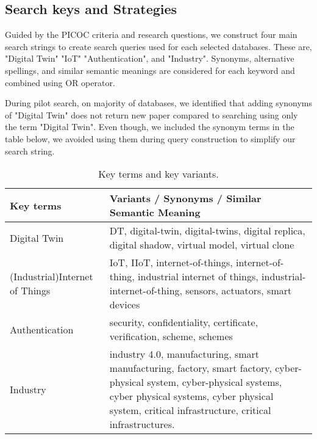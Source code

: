 \subsection{Search keys and Strategies}
Guided by the PICOC criteria and  research questions, we construct four main search strings to create search queries used for each selected databases. These are, "Digital Twin" "IoT" "Authentication", and "Industry". Synonyms, alternative spellings, and similar semantic meanings are considered for each keyword and combined using OR operator. 

During pilot search, on majority of databases, we identified that adding synonyms of "Digital Twin" does not return new paper compared to searching using only the term "Digital Twin". Even though, we included the synonym terms in the table below, we avoided using them during query construction to simplify our search string. 

\begin{table}[h]
\caption{ Key terms and key variants.}
\begin{NiceTabular}{p{3.2cm}p{11cm}}
\toprule
    \textbf{Key terms} & \textbf{Variants / Synonyms / Similar Semantic Meaning} \\
    \midrule
    Digital Twin & DT, digital-twin, digital-twins, digital replica, digital shadow, virtual model, virtual clone \\ \hline
    (Industrial)Internet of Things & IoT, IIoT, internet-of-things, internet-of-thing, industrial internet of things, industrial-internet-of-thing, sensors, actuators, smart devices  \\ \hline
    Authentication & security, confidentiality, certificate, verification, scheme, schemes\\ \hline
    Industry & industry 4.0, manufacturing, smart manufacturing, factory, smart factory, cyber-physical system, cyber-physical systems, cyber physical systems, cyber physical system, critical infrastructure, critical infrastructures. \\ 
\bottomrule
\end{NiceTabular}
\end{table}

